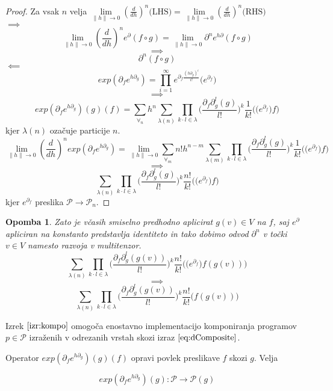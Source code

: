 \documentclass{article}
\newcommand{\dP}{\mathcal{P}}
\newcommand{\D}{\partial}
\newtheorem{opomba}{Opomba}[section]
\begin{document}
\begin{proof}
 Za vsak $n$ velja $\lim\limits_{\lVert h\rVert\to 0}(\frac{d}{dh})^n\text{(LHS)}=\lim\limits_{\lVert h\rVert\to 0}(\frac{d}{dh})^n\text{(RHS)}$\\
 $\implies$
 $$\lim\limits_{\lVert h\rVert\to 0}(\frac{d}{dh})^ne^\D(f\circ g)=\lim\limits_{\lVert h\rVert\to 0}\D^ne^{h\D}(f\circ g)$$
 $$\implies$$
 $$\D^n(f\circ g)$$
 $\impliedby$
 $$exp(\D_fe^{h\D_g})=\prod_{i=1}^{\infty}e^{\D_f\frac{(h\D_g)^i}{i!}}\Big(e^{\D_f}\Big)$$
 $$\implies$$
 $$exp(\D_fe^{h\D_g})(g)(f)=\sum\limits_{\forall_n}h^n\sum\limits_{\lambda(n)}\prod\limits_{k\cdot l\in\lambda}\Big(\frac{\D_f\D_g^l(g)}{l!}\Big)^k\frac{1}{k!}\Big(\Big(e^{\D_f}\Big)f\Big)$$
 kjer $\lambda(n)$ ozačuje particije $n$.
 $$\lim\limits_{\lVert h\rVert\to 0}(\frac{d}{dh})^nexp(\D_fe^{h\D_g})=\lim\limits_{\lVert h\rVert\to 0}\sum\limits_{\forall_m}n!h^{n-m}\sum\limits_{\lambda(m)}\prod\limits_{k\cdot l\in\lambda}\Big(\frac{\D_f\D_g^l(g)}{l!}\Big)^k\frac{1}{k!}\Big(\Big(e^{\D_f}\Big)f\Big)$$
 $$\implies$$
 \begin{equation}\label{eq:dComposite}
 \sum\limits_{\lambda(n)}\prod\limits_{k\cdot l\in\lambda}\Big(\frac{\D_f\D_g^l(g)}{l!}\Big)^k\frac{n!}{k!}\Big(\Big(e^{\D_f}\Big)f\Big)
 \end{equation}
 kjer $e^{\D_f}$ preslika $\dP\to\dP_n$. 
 \end{proof}       
 \begin{opomba}
 Zato je včasih smiselno predhodno aplicirat $g(v)\in V$ na $f$, saj $e^\D$ apliciran na konstanto predstavlja identiteto in tako dobimo odvod $\D^n$ v točki $v\in V$ namesto razvoja v multitenzor.
  $$\sum\limits_{\lambda(n)}\prod\limits_{k\cdot l\in\lambda}\Big(\frac{\D_f\D_g^l(g(v))}{l!}\Big)^k\frac{n!}{k!}\Big(\Big(e^{\D_f}\Big)f(g(v))\Big)$$
  $$\implies$$
  \begin{equation}\label{eq:dCompositePoint}
  \sum\limits_{\lambda(n)}\prod\limits_{k\cdot l\in\lambda}\Big(\frac{\D_f\D_g^l(g(v))}{l!}\Big)^k\frac{n!}{k!}\Big(f(g(v))\Big)
  \end{equation}
 \end{opomba}
 Izrek $\ref{izr:kompo}$ omogoča enostavno implementacijo komponiranja programov $p\in\dP$ izraženih v odrezanih vrstah skozi izraz $\eqref{eq:dComposite}$. 
 
 Operator $exp(\D_fe^{h\D_g})(g)(f)$ opravi povlek preslikave $f$ skozi $g$. Velja
 
 \begin{equation}
 exp(\D_fe^{h\D_g})(g): \dP\to\dP(g)
 \end{equation}
 
\end{document}
